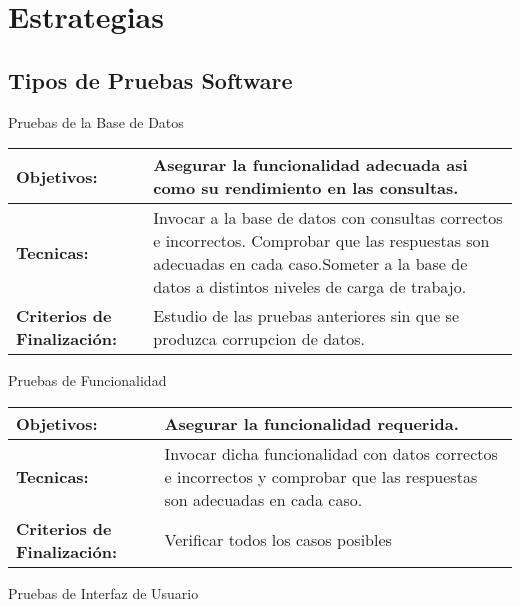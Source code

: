 \section{Estrategias}
\subsection{Tipos de Pruebas Software}
Pruebas de la Base de Datos

\begin{center}
   \begin{tabular}{|p{5cm}|p{10cm}|}
     \hline
     \textbf{Objetivos:} & Asegurar la funcionalidad adecuada asi como su \newline rendimiento en las consultas.  \\ \hline
     \textbf{Tecnicas:} & Invocar a la base de datos con consultas correctos e \newline incorrectos. \newline Comprobar que las respuestas son adecuadas en cada caso.\newline Someter a la base de datos a distintos niveles de carga de trabajo.  \\ \hline
     \textbf{Criterios de \newline Finalización:} & Estudio de las pruebas anteriores sin que se produzca corrupcion de datos. \\ \hline
   \end{tabular}
\end{center}

Pruebas de Funcionalidad

\begin{center}
   \begin{tabular}{|p{5cm}|p{10cm}|}
     \hline
     \textbf{Objetivos:} & Asegurar la funcionalidad requerida. \\ \hline
     \textbf{Tecnicas:} & Invocar dicha funcionalidad  con datos correctos e \newline incorrectos y comprobar que las respuestas son \newline adecuadas en cada caso.  \\ \hline
     \textbf{Criterios de \newline Finalización:} & Verificar todos los casos posibles \\ \hline
   \end{tabular}
\end{center}

Pruebas de Interfaz de Usuario

